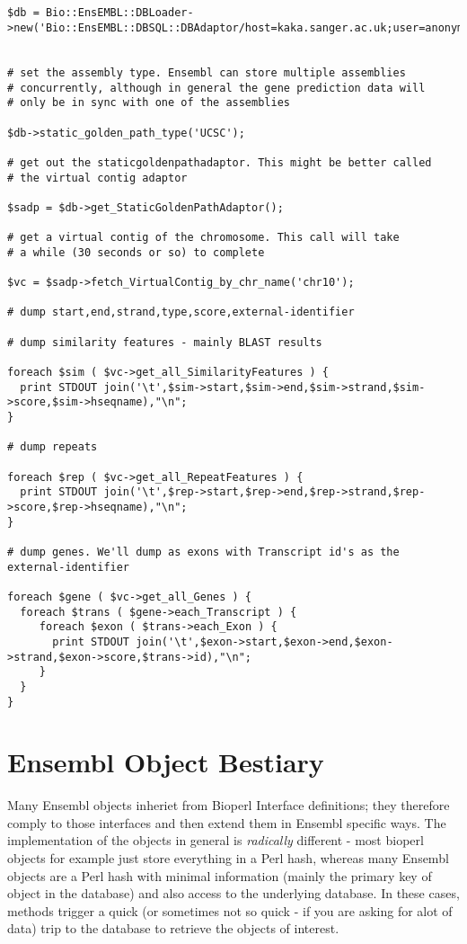 \documentclass[11pt,a4paper]{article}
\begin{document}
\begin{verbatim}


$db = Bio::EnsEMBL::DBLoader->new('Bio::EnsEMBL::DBSQL::DBAdaptor/host=kaka.sanger.ac.uk;user=anonymous;dbname=current');


# set the assembly type. Ensembl can store multiple assemblies
# concurrently, although in general the gene prediction data will
# only be in sync with one of the assemblies

$db->static_golden_path_type('UCSC');

# get out the staticgoldenpathadaptor. This might be better called
# the virtual contig adaptor

$sadp = $db->get_StaticGoldenPathAdaptor();

# get a virtual contig of the chromosome. This call will take
# a while (30 seconds or so) to complete

$vc = $sadp->fetch_VirtualContig_by_chr_name('chr10');

# dump start,end,strand,type,score,external-identifier

# dump similarity features - mainly BLAST results

foreach $sim ( $vc->get_all_SimilarityFeatures ) {
  print STDOUT join('\t',$sim->start,$sim->end,$sim->strand,$sim->score,$sim->hseqname),"\n";
}

# dump repeats

foreach $rep ( $vc->get_all_RepeatFeatures ) {
  print STDOUT join('\t',$rep->start,$rep->end,$rep->strand,$rep->score,$rep->hseqname),"\n";
}

# dump genes. We'll dump as exons with Transcript id's as the external-identifier

foreach $gene ( $vc->get_all_Genes ) {
  foreach $trans ( $gene->each_Transcript ) {
     foreach $exon ( $trans->each_Exon ) {
       print STDOUT join('\t',$exon->start,$exon->end,$exon->strand,$exon->score,$trans->id),"\n";
     }
  }
}

\end{verbatim}

\section{Ensembl Object Bestiary}

Many Ensembl objects inheriet from Bioperl Interface definitions; they
therefore comply to those interfaces and then extend them in Ensembl
specific ways. The implementation of the objects in general is
\emph{radically} different - most bioperl objects for example just
store everything in a Perl hash, whereas many Ensembl objects are a
Perl hash with minimal information (mainly the primary key of object
in the database) and also access to the underlying database. In these
cases, methods trigger a quick (or sometimes not so quick - if you are
asking for alot of data) trip to the database to retrieve the objects
of interest.
\end{document}
